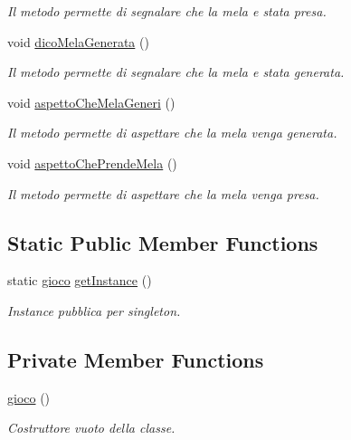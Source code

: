 \begin{DoxyCompactItemize}
\begin{DoxyCompactList}\small\item\em Il metodo permette di segnalare che la mela e\textquotesingle{} stata presa. \end{DoxyCompactList}\item 
void \mbox{\hyperlink{class_snake_1_1game_1_1gioco_a0de00fa3994a64cc918edd5944ac2569}{dico\+Mela\+Generata}} ()
\begin{DoxyCompactList}\small\item\em Il metodo permette di segnalare che la mela e\textquotesingle{} stata generata. \end{DoxyCompactList}\item 
void \mbox{\hyperlink{class_snake_1_1game_1_1gioco_a6eb3176cbeae2780913116900dd2d141}{aspetto\+Che\+Mela\+Generi}} ()
\begin{DoxyCompactList}\small\item\em Il metodo permette di aspettare che la mela venga generata. \end{DoxyCompactList}\item 
void \mbox{\hyperlink{class_snake_1_1game_1_1gioco_afe08c48d1322583ee9398d56ac218afa}{aspetto\+Che\+Prende\+Mela}} ()
\begin{DoxyCompactList}\small\item\em Il metodo permette di aspettare che la mela venga presa. \end{DoxyCompactList}\end{DoxyCompactItemize}
\subsection*{Static Public Member Functions}
\begin{DoxyCompactItemize}
\item 
static \mbox{\hyperlink{class_snake_1_1game_1_1gioco}{gioco}} \mbox{\hyperlink{class_snake_1_1game_1_1gioco_aeab124c2ec716095907dd38891f8163d}{get\+Instance}} ()
\begin{DoxyCompactList}\small\item\em Instance pubblica per singleton. \end{DoxyCompactList}\end{DoxyCompactItemize}
\subsection*{Private Member Functions}
\begin{DoxyCompactItemize}
\item 
\mbox{\hyperlink{class_snake_1_1game_1_1gioco_aaa8e0aba7a5f3cd7781bd0461d415f9e}{gioco}} ()
\begin{DoxyCompactList}\small\item\em Costruttore vuoto della classe. \end{DoxyCompactList}\end{DoxyCompactItemize}
